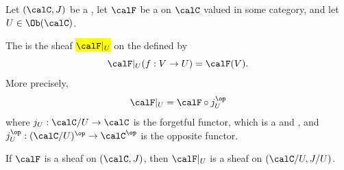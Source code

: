 \begin{definition} \label{definition:restriction_of_a_sheaf_on_a_site_to_an_object_of_the_underlying_category_of_the_site}
    Let $(\calC, J)$ be a , let $\calF$ be a  on $\calC$ valued in some category, and let $U \in \Ob(\calC)$. 

    The  is the sheaf \hl{$\calF|_U$} on the  defined by 
    $$\calF|_U(f: V \to U) = \calF(V).$$
    More precisely,
    $$\calF|_U  = \calF \circ j_U^{\op}$$
    where $j_U: \calC/U \to \calC$ is the forgetful functor, which is a  and ,  and $j_U^{\op}: (\calC/U)^{\op} \to \calC^{\op}$ is the opposite functor.

    If $\calF$ is a sheaf on $(\calC, J)$, then $\calF|_U$ is a sheaf on $(\calC/U, J/U)$. 
\end{definition}